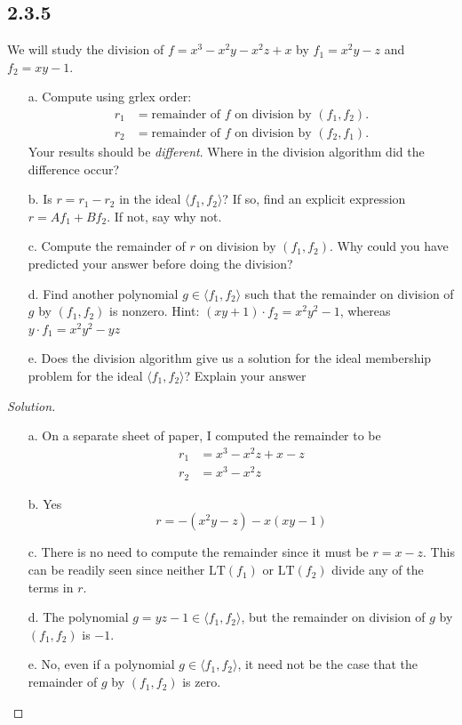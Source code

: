 \documentclass[]{article}
\newcommand\<{\langle}
\renewcommand\>{\rangle}
\newenvironment{solution}
{
	\begin{proof}[Solution] \text{ }
		\\
	}
	{
	\end{proof}
}
\begin{document}
\subsection*{2.3.5} We will study the division of $f = x^3 - x^2y - x^2z + x$ by $f_1 = x^2y-z$ and $f_2 = xy - 1$. 
\begin{enumerate}
	\item[a.] Compute using grlex order:
	\begin{align*}
		r_1 &= \text{remainder of $f$ on division by $\left(f_1, f_2\right)$.} \\
		r_2 &= \text{remainder of $f$ on division by $\left(f_2, f_1\right)$.}
	\end{align*}
	Your results should be \textit{different}. Where in the division algorithm did the difference occur?
	\item[b.] Is $r = r_1 - r_2$ in the ideal $\<f_1, f_2\>$? If so, find an explicit expression $r = Af_1 + Bf_2$. If not, say why not.
	\item[c.] Compute the remainder of $r$ on division by $\left(f_1, f_2\right)$. Why could you have predicted your answer before doing the division?
	\item[d.] Find another polynomial $g \in \<f_1, f_2\>$ such that the remainder on division of $g$ by $(f_1, f_2)$ is nonzero. Hint: $(xy + 1)\cdot f_2 = x^2y^2 - 1$, whereas $y\cdot f_1 = x^2y^2-yz$
	\item[e.] Does the division algorithm give us a solution for the ideal membership problem for the ideal $\<f_1, f_2\>$? Explain your answer
\end{enumerate}
\begin{solution}
	\begin{enumerate}
		\item[a.] On a separate sheet of paper, I computed the remainder to be
		\begin{align*}
			r_1 &= x^3 - x^2z + x - z \\
			r_2 &= x^3 - x^2z
		\end{align*}
		\item[b.] Yes
		$$
			r = -\left(x^2y - z\right) - x\left(xy - 1\right)
		$$
		\item[c.] There is no need to compute the remainder since it must be $r = x - z$. This can be readily seen since neither $\text{LT}(f_1)$ or $\text{LT}(f_2)$ divide any of the terms in $r$. 
		\item[d.] The polynomial $g = yz - 1 \in \<f_1, f_2\>$, but the remainder on division of $g$ by $(f_1, f_2)$ is $-1$.
		\item[e.] No, even if a polynomial $g \in \<f_1, f_2\>$, it need not be the case that the remainder of $g$ by $(f_1, f_2)$ is zero.
	\end{enumerate}
\end{solution}
\end{document}
